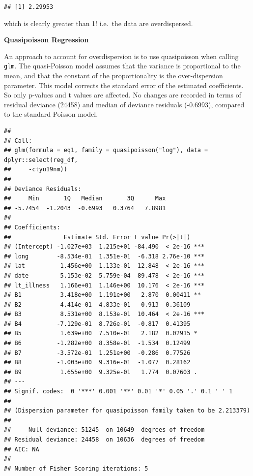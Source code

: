 \documentclass[
]{book}
\newenvironment{Shaded}{\begin{snugshade}}{\end{snugshade}}
\newcommand{\CommentTok}[1]{\textcolor[rgb]{0.56,0.35,0.01}{\textit{#1}}}
\newcommand{\DataTypeTok}[1]{\textcolor[rgb]{0.13,0.29,0.53}{#1}}
\newcommand{\KeywordTok}[1]{\textcolor[rgb]{0.13,0.29,0.53}{\textbf{#1}}}
\newcommand{\NormalTok}[1]{#1}
\newcommand{\OperatorTok}[1]{\textcolor[rgb]{0.81,0.36,0.00}{\textbf{#1}}}
\newcommand{\StringTok}[1]{\textcolor[rgb]{0.31,0.60,0.02}{#1}}
\begin{document}
\begin{verbatim}
## [1] 2.29953
\end{verbatim}

which is clearly greater than 1! i.e.~the data are overdispersed.

\textbf{Quasipoisson Regression}

An approach to account for overdispersion is to use quasipoisson when calling \texttt{glm}. The quasi-Poisson model assumes that the variance is proportional to the mean, and that the constant of the proportionality is the over-dispersion parameter. This model corrects the standard error of the estimated coefficients. So only p-values and t values are affected. No changes are recorded in terms of residual deviance (24458) and median of deviance residuals (-0.6993), compared to the standard Poisson model.

\begin{Shaded}
\end{Shaded}

\begin{verbatim}
## 
## Call:
## glm(formula = eq1, family = quasipoisson("log"), data = dplyr::select(reg_df, 
##     -ctyu19nm))
## 
## Deviance Residuals: 
##     Min       1Q   Median       3Q      Max  
## -5.7454  -1.2043  -0.6993   0.3764   7.8981  
## 
## Coefficients:
##               Estimate Std. Error t value Pr(>|t|)    
## (Intercept) -1.027e+03  1.215e+01 -84.490  < 2e-16 ***
## long        -8.534e-01  1.351e-01  -6.318 2.76e-10 ***
## lat          1.456e+00  1.133e-01  12.848  < 2e-16 ***
## date         5.153e-02  5.759e-04  89.478  < 2e-16 ***
## lt_illness   1.166e+01  1.146e+00  10.176  < 2e-16 ***
## B1           3.418e+00  1.191e+00   2.870  0.00411 ** 
## B2           4.414e-01  4.833e-01   0.913  0.36109    
## B3           8.531e+00  8.153e-01  10.464  < 2e-16 ***
## B4          -7.129e-01  8.726e-01  -0.817  0.41395    
## B5           1.639e+00  7.510e-01   2.182  0.02915 *  
## B6          -1.282e+00  8.358e-01  -1.534  0.12499    
## B7          -3.572e-01  1.251e+00  -0.286  0.77526    
## B8          -1.003e+00  9.316e-01  -1.077  0.28162    
## B9           1.655e+00  9.325e-01   1.774  0.07603 .  
## ---
## Signif. codes:  0 '***' 0.001 '**' 0.01 '*' 0.05 '.' 0.1 ' ' 1
## 
## (Dispersion parameter for quasipoisson family taken to be 2.213379)
## 
##     Null deviance: 51245  on 10649  degrees of freedom
## Residual deviance: 24458  on 10636  degrees of freedom
## AIC: NA
## 
## Number of Fisher Scoring iterations: 5
\end{verbatim}
\end{document}
